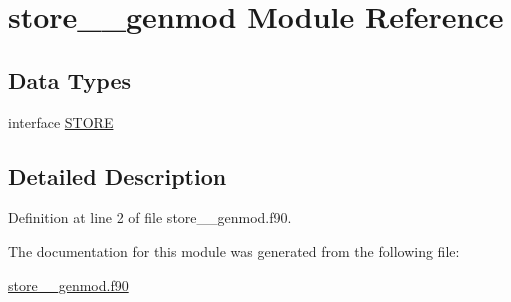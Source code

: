 \hypertarget{classstore____genmod}{\section{store\+\_\+\+\_\+genmod Module Reference}
\label{classstore____genmod}
}
\subsection*{Data Types}
\begin{DoxyCompactItemize}
\item 
interface \hyperlink{interfacestore____genmod_1_1STORE}{S\+T\+O\+R\+E}
\end{DoxyCompactItemize}


\subsection{Detailed Description}


Definition at line 2 of file store\+\_\+\+\_\+genmod.\+f90.



The documentation for this module was generated from the following file\+:\begin{DoxyCompactItemize}
\item 
\hyperlink{store____genmod_8f90}{store\+\_\+\+\_\+genmod.\+f90}\end{DoxyCompactItemize}
